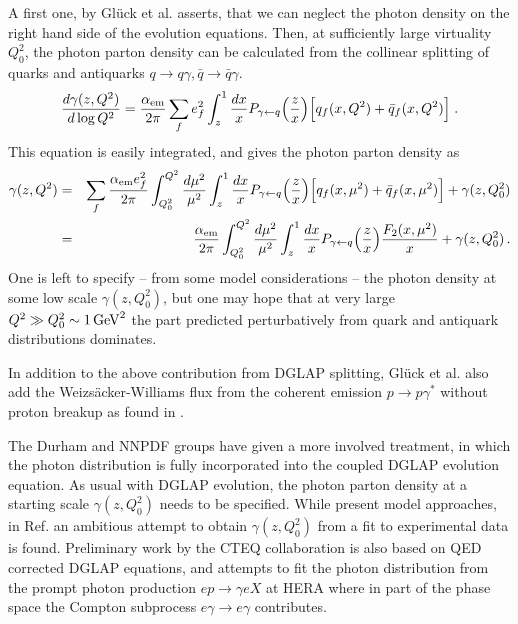 A first one, by Gl\"uck et al. \cite{Gluck:2002fi} asserts, that 
we can neglect the photon density on the right hand side of the evolution equations.
Then, at sufficiently large virtuality $Q_0^2$, the photon parton density can
be calculated from the collinear splitting of quarks and antiquarks 
$q \to q \gamma, \bar q \to \bar q  \gamma$. 
\begin{eqnarray}
 {d \gamma(z,Q^2)\over d \log Q^2} = {{\alpha_{\mathrm{em}}} \over 2 \pi} \sum_f  e_f^2 \int_z^1 {dx \over x}   P_{\gamma \leftarrow q}\Big({z \over x}\Big)
\Big[ q_f(x,Q^2) + \bar q_f(x,Q^2) \Big] \; .
\label{eq:Dortmund}
\end{eqnarray}
This equation is easily integrated, and gives the photon parton density as
\begin{eqnarray}
 \gamma(z,Q^2) &=& \sum_f { {\alpha_{\mathrm{em}}} e_f^2 \over 2 \pi} \int_{Q_0^2}^{Q^2} {d \mu^2 \over \mu^2} 
\int_z^1 {dx \over x}  P_{\gamma \leftarrow q}\Big({z \over x}\Big)
\Big[ q_f(x,\mu^2) + \bar q_f(x,\mu^2) \Big] + \gamma(z,Q_0^2) \nonumber \\
&=& {{\alpha_{\mathrm{em}}} \over 2 \pi} \int_{Q_0^2}^{Q^2} {d \mu^2 \over \mu^2} \int_z^1 {dx \over x}  
P_{\gamma \leftarrow q}\Big({z \over x}\Big) {F_2(x,\mu^2) \over x} 
+ \gamma(z,Q_0^2) \, .
\end{eqnarray}
One is left to specify -- from some  model considerations -- the photon density at some low scale $\gamma(z,Q_0^2)$, but
one may hope that at very large $Q^2 \gg Q_0^2 \sim 1 \, {\rm GeV}^2$ the part predicted perturbatively 
from quark and antiquark distributions dominates.

In addition to the above contribution from DGLAP splitting, Gl\"uck et
al. also add the Weizs\"acker-Williams flux from the coherent emission 
$p \to p \gamma^*$ without proton breakup as found in \cite{Budnev:1974de}.
 
The Durham \cite{Martin:2004dh,Martin:2014nqa} and NNPDF 
\cite{Ball:2013hta} groups have given a more involved treatment, 
in which the photon distribution is fully incorporated into the coupled 
DGLAP evolution equation.
As usual with DGLAP evolution, the photon parton density at a starting scale 
$\gamma(z,Q_0^2)$ needs to be specified. While \cite{Martin:2004dh,Martin:2014nqa} present model approaches, in Ref.\cite{Ball:2013hta} an ambitious attempt to
obtain $\gamma(z,Q_0^2)$ from a fit to experimental data is found.
Preliminary work by the CTEQ collaboration \cite{Schmidt:2014aba} is
also based on QED corrected DGLAP equations,
and attempts to fit the photon distribution from the prompt photon
production $e p \to \gamma e X$ at HERA
where in part of the phase space the Compton subprocess $e \gamma \to e \gamma$ contributes.

